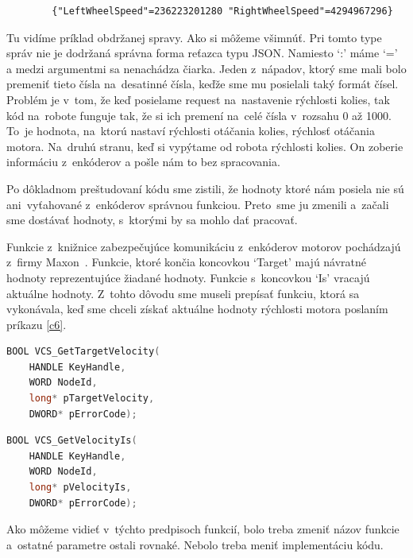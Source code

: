 \label{jsonWannabeSpeed}
\begin{lstlisting}
		{"LeftWheelSpeed"=236223201280 "RightWheelSpeed"=4294967296}
\end{lstlisting}

Tu vidíme príklad obdržanej spravy. Ako si môžeme všimnúť. Pri tomto type správ nie je dodržaná správna forma reťazca typu JSON. Namiesto `:' máme `='
a medzi argumentmi sa nenachádza čiarka. Jeden z~nápadov, ktorý sme mali bolo premeniť tieto čísla na~desatinné čísla, keďže sme mu posielali taký formát čísel.
Problém je v~tom, že keď posielame request na~nastavenie rýchlosti kolies, tak kód na~robote funguje tak, že si ich premení na~celé čísla v~rozsahu 0 až 1000.
To~je hodnota, na~ktorú nastaví rýchlosti otáčania kolies, rýchlosť otáčania motora. Na~druhú stranu, keď si vypýtame od robota rýchlosti kolies. On zoberie
informáciu z~enkóderov a pošle nám to bez spracovania.

Po dôkladnom preštudovaní kódu sme zistili, že hodnoty ktoré nám posiela nie sú ani~vyťahované z~enkóderov správnou funkciou. Preto~sme ju zmenili a~začali sme dostávať hodnoty,
s~ktorými by sa mohlo dať pracovať.

Funkcie z~knižnice zabezpečujúce komunikáciu z~enkóderov motorov pochádzajú z~firmy Maxon~\cite{EPOSdoc}. Funkcie, ktoré končia koncovkou `Target' majú
návratné hodnoty reprezentujúce žiadané hodnoty. Funkcie s~koncovkou `Is' vracajú aktuálne hodnoty. Z~tohto dôvodu sme museli prepísať funkciu, ktorá sa vykonávala,
keď sme chceli získať aktuálne hodnoty rýchlosti motora poslaním príkazu \ref{c6}.


\label{VelocityIs}
\begin{lstlisting}[language=C++]
BOOL VCS_GetTargetVelocity(
	HANDLE KeyHandle,
	WORD NodeId,
	long* pTargetVelocity,
	DWORD* pErrorCode);
\end{lstlisting}

\begin{lstlisting}[language=C++]
BOOL VCS_GetVelocityIs(
	HANDLE KeyHandle,
	WORD NodeId,
	long* pVelocityIs,
	DWORD* pErrorCode);
\end{lstlisting}

\noindent Ako môžeme vidieť v~týchto predpisoch funkcií, bolo treba zmeniť názov funkcie a~ostatné parametre ostali rovnaké.
Nebolo treba meniť implementáciu kódu.


